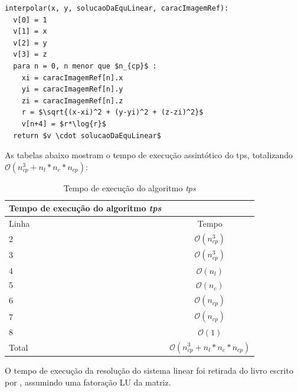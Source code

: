 \begin{lstlisting}[mathescape]
interpolar(x, y, solucaoDaEquLinear, caracImagemRef):
  v[0] = 1
  v[1] = x
  v[2] = y
  v[3] = z
  para n = 0, n menor que $n_{cp}$ :
    xi = caracImagemRef[n].x
    yi = caracImagemRef[n].y
    zi = caracImagemRef[n].z
    r = $\sqrt{(x-xi)^2 + (y-yi)^2 + (z-zi)^2}$
    v[n+4] = $r*\log{r}$
  return $v \cdot solucaoDaEquLinear$
\end{lstlisting}

  As tabelas abaixo mostram o tempo de execução assintótico do tps, totalizando
$\mathcal{O}(n_{cp}^3+n_l*n_c*n_{cp})$:

\begin{table}[H]
\begin{center}
\begin{tabular}{l|c}
\hline
Tempo de execução do algoritmo \textit{tps} \\
\hline
Linha&Tempo\\
\hline
2       &$\mathcal{O}(n_{cp}^3)$\\
3       &$\mathcal{O}(n_{cp}^3)$\\
4       &$\mathcal{O}(n_l)$\\
5       &$\mathcal{O}(n_c)$\\
6       &$\mathcal{O}(n_{cp})$\\
7       &$\mathcal{O}(n_{cp})$\\
8       &$\mathcal{O}(1)$\\
\hline
Total   &$\mathcal{O}(n_{cp}^3+n_l*n_c*n_{cp})$\\
\hline
\end{tabular}
\caption{Tempo de execução do algoritmo \textit{tps}}
\label{table:tps}
\end{center}
\end{table}

  O tempo de execução da resolução do sistema linear foi retirada do livro escrito por
\cite[Part~IV]{trefethen1997numerical}, assumindo uma fatoração LU da matriz.

